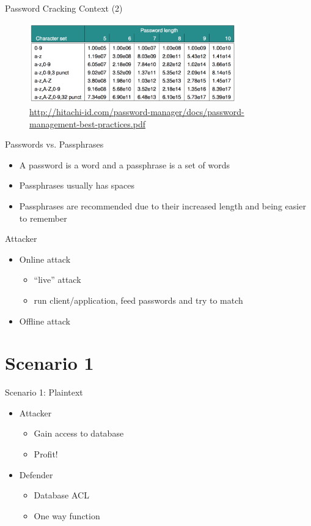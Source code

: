 \documentclass{curs}
\begin{document}
\begin{frame}{Password Cracking Context (2)}
  \begin{figure}
    \centering
    \includegraphics[width=0.8\textwidth]{img/password-complexity.png} \\
    \tiny{\url{http://hitachi-id.com/password-manager/docs/password-management-best-practices.pdf}}
  \end{figure}
\end{frame}

\begin{frame}{Passwords vs. Passphrases}
  \begin{itemize}
    \item A password is a word and a passphrase is a set of words
    \item Passphrases usually has spaces
    \item Passphrases are recommended due to their increased length and being
      easier to remember
  \end{itemize}
\end{frame}

\begin{frame}{Attacker}
  \begin{itemize}
    \item Online attack
      \begin{itemize}
        \item ``live'' attack
        \item run client/application, feed passwords and try to match
      \end{itemize}
    \item Offline attack
  \end{itemize}
\end{frame}

\section {Scenario 1}

\begin{frame}{Scenario 1: Plaintext}
  \begin{itemize}
    \item Attacker \begin{itemize}
      \item Gain access to database
      \item Profit!
    \end{itemize}
    \item Defender \begin{itemize}
      \item Database ACL
      \item One way function
    \end{itemize}
  \end{itemize}
\end{frame}
\end{document}
